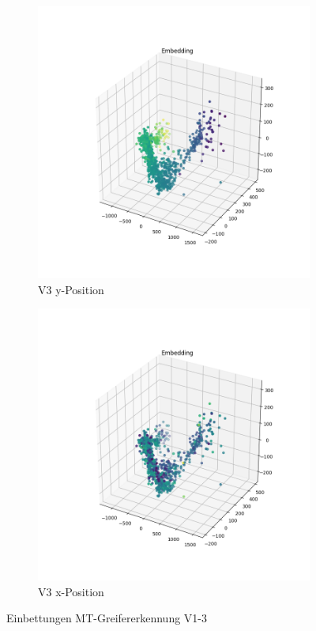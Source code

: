 \begin{figure}[h]
		\begin{subfigure}[c]{0.49\textwidth}			
		\includegraphics[width=1\textwidth,center]{bilder/Hauptteil/MT_Grapple/EMB_alle/3_Embedding_y.png}
		\caption{V3 y-Position}
		\label{img:Einbettung3_y}	
	\end{subfigure}
	\centering
	\begin{subfigure}[c]{0.49\textwidth}			
		\includegraphics[width=1\textwidth,center]{bilder/Hauptteil/MT_Grapple/EMB_alle/3_Embedding_x.png}
		\caption{V3 x-Position}
		\label{img:Einbettung3_x}		
	\end{subfigure}
	
		\caption{Einbettungen MT-Greifererkennung V1-3}
		\label{img:Einbettungen1-3}
	\end{figure}

